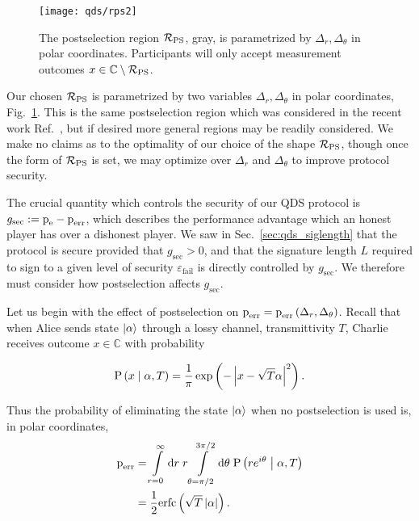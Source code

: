 \begin{figure}[htp]
\centering
\texttt{[image: qds/rps2]}
\caption{\label{fig:rps} The postselection region $\mathcal{R}_{\text{PS}}$, gray, is parametrized by $\Delta_r, \Delta_\theta$ in polar coordinates. Participants will only accept measurement outcomes $x \in \mathbb{C} \setminus \mathcal{R}_{\text{PS}}$. }
\end{figure}

Our chosen $\mathcal{R}_{\text{PS}}$ is parametrized by two variables $\Delta_r, \Delta_\theta$ in polar coordinates, Fig.~\ref{fig:rps}. This is the same postselection region which was considered in the recent work Ref.~\cite{Lin2019}, but if desired more general regions may be readily considered. We make no claims as to the optimality of our choice of the shape $\mathcal{R}_{\text{PS}}$, though once the form of $\mathcal{R}_{\text{PS}}$ is set, we may optimize over $\Delta_r$ and $\Delta_\theta$ to improve protocol security.

The crucial quantity which controls the security of our QDS protocol is $g_{\text{sec}} := \text{p}_{\text{e}} - \text{p}_{\text{err}}$, which describes the performance advantage which an honest player has over a dishonest player. We saw in Sec.~\ref{sec:qds_siglength} that the protocol is secure provided that $g_{\text{sec}} > 0$, and that the signature length $L$ required to sign to a given level of security $\varepsilon_{\text{fail}}$ is directly controlled by $g_{\text{sec}}$. We therefore must consider how postselection affects $g_{\text{sec}}$. 

Let us begin with the effect of postselection on $\text{p}_{\text{err}} = \text{p}_{\text{err}}\left(\Delta_r, \Delta_\theta\right)$. %
Recall that when Alice sends state $\ket{\alpha}$ through a lossy channel, transmittivity $T$, Charlie receives outcome $x \in \mathbb{C}$ with probability

\begin{equation}
\text{P}\left(x \; \middle| \; \alpha, T\right) = \frac{1}{\pi} \exp\left( - \left| x - \sqrt{T}\alpha\right|^2\right).
\end{equation}

\noindent Thus the probability of eliminating the state $\ket{\alpha}$ when no postselection is used is, in polar coordinates,
\begin{align}\label{eqn:perrps_deriv_nops}
\perr &= \int\limits_{r=0}^\infty \mathrm{d}r \; r \int\limits_{\theta = \pi/2}^{3 \pi/2} \mathrm{d}\theta \; \text{P}\left(r e^{i \theta} \given \alpha, T\right) \notag \\
%
&= \frac{1}{2}\erfc\left(\sqrt{T}\left|\alpha\right|\right).
\end{align}


